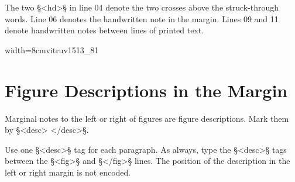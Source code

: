 \documentclass[fontsize=11pt, paper=a4, 
DIV15,
headings=normal, %
parskip=half-,
numbers=noenddot %
]{scrartcl}
\begin{document}
\begin{note}
The two §<hd>§ in line 04 denote the two crosses above the struck-through words. Line 06 denotes the handwritten note in the margin. Lines 09 and 11 denote handwritten notes between lines of printed text.
\end{note}



\vspace{5mm}
\begin{sampleImageSmall}{width=8cm}{vitruv1513_81}

\end{sampleImageSmall}


\section{Figure Descriptions in the Margin}

\begin{mainrule}
Marginal notes to the left or right of figures are figure descriptions. Mark them by §<desc> </desc>§.
\end{mainrule}

\begin{clarification}
Use one §<desc>§ tag for each paragraph. As always, type the §<desc>§ tags between the §<fig>§ and §</fig>§ lines. The position of the description in the left or right margin is not encoded.
\end{clarification}
\end{document}
